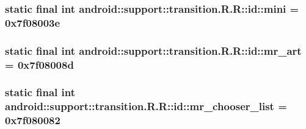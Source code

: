 \hypertarget{classandroid_1_1support_1_1transition_1_1_r_1_1id_dd7b8c5a603667fb98d66d2b69fcc5c6}{
\subsubsection[{mini}]{\setlength{\rightskip}{0pt plus 5cm}static final int android::support::transition.R.R::id::mini = 0x7f08003e}}
\label{classandroid_1_1support_1_1transition_1_1_r_1_1id_dd7b8c5a603667fb98d66d2b69fcc5c6}


\hypertarget{classandroid_1_1support_1_1transition_1_1_r_1_1id_db7b1115ed1a475dba93ebd2ea685632}{
\subsubsection[{mr\_\-art}]{\setlength{\rightskip}{0pt plus 5cm}static final int android::support::transition.R.R::id::mr\_\-art = 0x7f08008d}}
\label{classandroid_1_1support_1_1transition_1_1_r_1_1id_db7b1115ed1a475dba93ebd2ea685632}


\hypertarget{classandroid_1_1support_1_1transition_1_1_r_1_1id_bd90f7b8aba939f38805a3734b5fa1ce}{
\subsubsection[{mr\_\-chooser\_\-list}]{\setlength{\rightskip}{0pt plus 5cm}static final int android::support::transition.R.R::id::mr\_\-chooser\_\-list = 0x7f080082}}
\label{classandroid_1_1support_1_1transition_1_1_r_1_1id_bd90f7b8aba939f38805a3734b5fa1ce}


